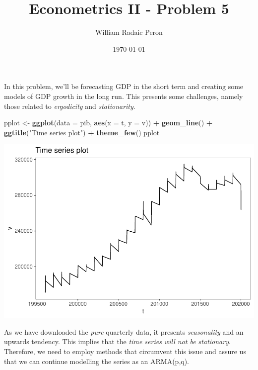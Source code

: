 \documentclass[
]{article}
\title{Econometrics II - Problem 5}
\author{William Radaic Peron}
\date{\today}
\newenvironment{Shaded}{\begin{snugshade}}{\end{snugshade}}
\newcommand{\DataTypeTok}[1]{\textcolor[rgb]{0.13,0.29,0.53}{#1}}
\newcommand{\KeywordTok}[1]{\textcolor[rgb]{0.13,0.29,0.53}{\textbf{#1}}}
\newcommand{\NormalTok}[1]{#1}
\newcommand{\OperatorTok}[1]{\textcolor[rgb]{0.81,0.36,0.00}{\textbf{#1}}}
\newcommand{\StringTok}[1]{\textcolor[rgb]{0.31,0.60,0.02}{#1}}
\begin{document}
\maketitle

In this problem, we'll be forecasting GDP in the short term and creating
some models of GDP growth in the long run. This presents some
challenges, namely those related to \emph{ergodicity} and
\emph{stationarity}.

\begin{Shaded}
\begin{Highlighting}[]
\NormalTok{pplot <-}\StringTok{ }\KeywordTok{ggplot}\NormalTok{(}\DataTypeTok{data =}\NormalTok{ pib, }\KeywordTok{aes}\NormalTok{(}\DataTypeTok{x =}\NormalTok{ t, }\DataTypeTok{y =}\NormalTok{ v)) }\OperatorTok{+}\StringTok{ }\KeywordTok{geom_line}\NormalTok{() }\OperatorTok{+}\StringTok{ }
\StringTok{    }\KeywordTok{ggtitle}\NormalTok{(}\StringTok{"Time series plot"}\NormalTok{) }\OperatorTok{+}\StringTok{ }\KeywordTok{theme_few}\NormalTok{()}
\NormalTok{pplot}
\end{Highlighting}
\end{Shaded}

\begin{center}\includegraphics{Econo2_P5_files/figure-latex/plots-1} \end{center}

As we have downloaded the \emph{pure} quarterly data, it presents
\emph{seasonality} and an upwards tendency. This implies that the
\emph{time series will not be stationary}. Therefore, we need to employ
methods that circumvent this issue and assure us that we can continue
modelling the series as an ARMA(p,q).
\end{document}
